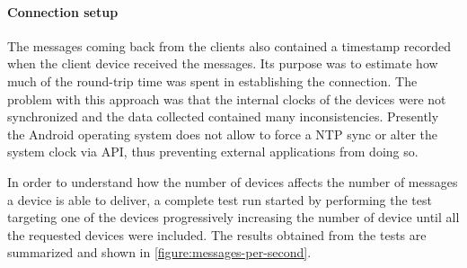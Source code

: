 \paragraph{Connection setup} 
The messages coming back from the clients also contained a timestamp recorded when the client device received the messages.
Its purpose was to estimate how much of the round-trip time was spent in establishing the connection.
The problem with this approach was that the internal clocks of the devices were not synchronized and the data collected contained many inconsistencies.
Presently the Android operating system does not allow to force a NTP sync or alter the system clock via API, thus preventing external applications from doing so.

In order to understand how the number of devices affects the number of messages a device is able to deliver, a complete test run started by performing the test targeting one of the devices progressively increasing the number of device until all the requested devices were included.
The results obtained from the tests are summarized and shown in \ref{figure:messages-per-second}.
